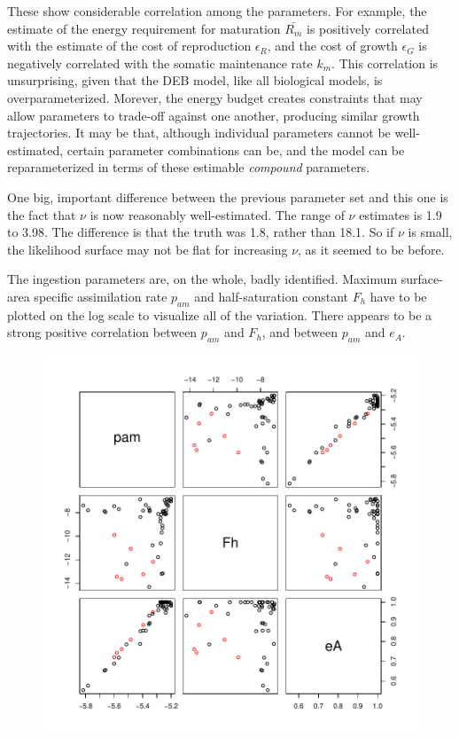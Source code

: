 \documentclass[12pt,reqno,final]{amsart}
\theoremstyle{plain}
\numberwithin{equation}{part}
\begin{document}
These show considerable correlation among the parameters. For example,
the estimate of the energy requirement for maturation $\bar{R_m}$ is
positively correlated with the estimate of the cost of
reproduction $\epsilon_R$, and the cost of growth $\epsilon_G$ is
negatively correlated with the somatic maintenance rate $k_m$. This
correlation is unsurprising, given that the DEB model, like
all biological models, is overparameterized. Morever, the energy
budget creates constraints that may allow parameters to trade-off
against one another, producing similar growth trajectories. It may be
that, although individual parameters cannot be well-estimated, certain
parameter combinations can be, and the model can be reparameterized in
terms of these estimable \emph{compound} parameters.

One big, important difference between the previous parameter set and
this one is the fact that $\nu$ is now reasonably well-estimated. The
range of $\nu$ estimates is 1.9 to 3.98. The difference is that the
truth was 1.8, rather than 18.1. So if $\nu$ is small, the likelihood
surface may not be flat for increasing $\nu$, as it seemed to be
before.

The ingestion parameters are, on the whole, badly identified. Maximum
surface-area specific assimilation rate $p_{am}$ and half-saturation
constant $F_h$ have to be plotted on the log scale to visualize all of
the variation. There appears to be a strong positive correlation
between $p_{am}$ and $F_h$, and between $p_{am}$ and $e_A$.

\begin{figure}
\includegraphics{Solving_the_problem_of_parameter_covariation_4-002}
\end{figure}
\end{document}
